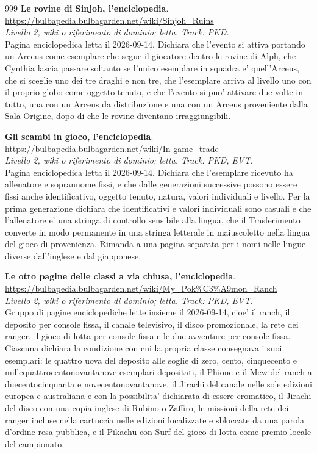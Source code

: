 \begin{thebibliography}{999}
  \textbf{Le rovine di Sinjoh, l'enciclopedia}.
  \\ \url{https://bulbapedia.bulbagarden.net/wiki/Sinjoh_Ruins}
  \\ \emph{Livello 2, wiki o riferimento di dominio; letta. Track: PKD.}
  \\ Pagina enciclopedica letta il 2026-09-14. Dichiara che l'evento si attiva portando un Arceus come esemplare che segue il giocatore dentro le rovine di Alph, che Cynthia lascia passare soltanto se l'unico esemplare in squadra e' quell'Arceus, che si sceglie uno dei tre draghi e non tre, che l'esemplare arriva al livello uno con il proprio globo come oggetto tenuto, e che l'evento si puo' attivare due volte in tutto, una con un Arceus da distribuzione e una con un Arceus proveniente dalla Sala Origine, dopo di che le rovine diventano irraggiungibili.

  \textbf{Gli scambi in gioco, l'enciclopedia}.
  \\ \url{https://bulbapedia.bulbagarden.net/wiki/In-game_trade}
  \\ \emph{Livello 2, wiki o riferimento di dominio; letta. Track: PKD, EVT.}
  \\ Pagina enciclopedica letta il 2026-09-14. Dichiara che l'esemplare ricevuto ha allenatore e soprannome fissi, e che dalle generazioni successive possono essere fissi anche identificativo, oggetto tenuto, natura, valori individuali e livello. Per la prima generazione dichiara che identificativi e valori individuali sono casuali e che l'allenatore e' una stringa di controllo sensibile alla lingua, che il Trasferimento converte in modo permanente in una stringa letterale in maiuscoletto nella lingua del gioco di provenienza. Rimanda a una pagina separata per i nomi nelle lingue diverse dall'inglese e dal giapponese.

  \textbf{Le otto pagine delle classi a via chiusa, l'enciclopedia}.
  \\ \url{https://bulbapedia.bulbagarden.net/wiki/My_Pok\%C3\%A9mon_Ranch}
  \\ \emph{Livello 2, wiki o riferimento di dominio; letta. Track: PKD, EVT.}
  \\ Gruppo di pagine enciclopediche lette insieme il 2026-09-14, cioe' il ranch, il deposito per console fissa, il canale televisivo, il disco promozionale, la rete dei ranger, il gioco di lotta per console fissa e le due avventure per console fissa. Ciascuna dichiara la condizione con cui la propria classe consegnava i suoi esemplari: le quattro uova del deposito alle soglie di zero, cento, cinquecento e millequattrocentonovantanove esemplari depositati, il Phione e il Mew del ranch a duecentocinquanta e novecentonovantanove, il Jirachi del canale nelle sole edizioni europea e australiana e con la possibilita' dichiarata di essere cromatico, il Jirachi del disco con una copia inglese di Rubino o Zaffiro, le missioni della rete dei ranger incluse nella cartuccia nelle edizioni localizzate e sbloccate da una parola d'ordine resa pubblica, e il Pikachu con Surf del gioco di lotta come premio locale del campionato.


\end{thebibliography}
